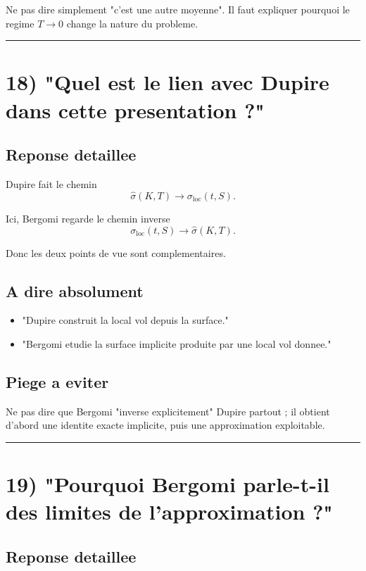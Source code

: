 \documentclass[11pt,a4paper]{article}
\begin{document}
Ne pas dire simplement "c'est une autre moyenne". Il faut expliquer pourquoi le regime \(T\to 0\) change la nature du probleme.

\bigskip\hrule\bigskip

\section{18) "Quel est le lien avec Dupire dans cette presentation ?"}

\subsection{Reponse detaillee}

Dupire fait le chemin
\[
\hat{\sigma}(K,T)\longrightarrow \sigma_{\mathrm{loc}}(t,S).
\]

Ici, Bergomi regarde le chemin inverse
\[
\sigma_{\mathrm{loc}}(t,S)\longrightarrow \hat{\sigma}(K,T).
\]

Donc les deux points de vue sont complementaires.

\subsection{A dire absolument}

\begin{itemize}
\item "Dupire construit la local vol depuis la surface."
\item "Bergomi etudie la surface implicite produite par une local vol donnee."
\end{itemize}

\subsection{Piege a eviter}

Ne pas dire que Bergomi "inverse explicitement" Dupire partout ; il obtient d'abord une identite exacte implicite, puis une approximation exploitable.

\bigskip\hrule\bigskip

\section{19) "Pourquoi Bergomi parle-t-il des limites de l'approximation ?"}

\subsection{Reponse detaillee}
\end{document}
